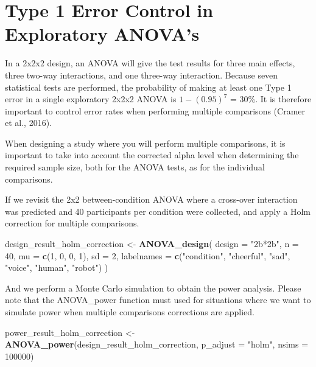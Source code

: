 \documentclass[
  ,man,floatsintext]{apa6}
\newenvironment{Shaded}{\begin{snugshade}}{\end{snugshade}}
\newcommand{\DataTypeTok}[1]{\textcolor[rgb]{0.13,0.29,0.53}{#1}}
\newcommand{\DecValTok}[1]{\textcolor[rgb]{0.00,0.00,0.81}{#1}}
\newcommand{\KeywordTok}[1]{\textcolor[rgb]{0.13,0.29,0.53}{\textbf{#1}}}
\newcommand{\NormalTok}[1]{#1}
\newcommand{\StringTok}[1]{\textcolor[rgb]{0.31,0.60,0.02}{#1}}
\begin{document}
\hypertarget{type-1-error-control-in-exploratory-anovas}{%
\section{Type 1 Error Control in Exploratory ANOVA's}\label{type-1-error-control-in-exploratory-anovas}}

In a 2x2x2 design, an ANOVA will give the test results for three main effects, three two-way interactions, and one three-way interaction.
Because seven statistical tests are performed, the probability of making at least one Type 1 error in a single exploratory 2x2x2 ANOVA is \(1-(0.95)^7\) = 30\%.
It is therefore important to control error rates when performing multiple comparisons (Cramer et al., 2016).

When designing a study where you will perform multiple comparisons, it is important to take into account the corrected alpha level when determining the required sample size, both for the ANOVA tests, as for the individual comparisons.

If we revisit the 2x2 between-condition ANOVA where a cross-over interaction was predicted and 40 participants per condition were collected, and apply a Holm correction for multiple comparisons.

\begin{Shaded}
\begin{Highlighting}[]
\NormalTok{design_result_holm_correction <-}
\StringTok{  }\KeywordTok{ANOVA_design}\NormalTok{(}
    \DataTypeTok{design =} \StringTok{"2b*2b"}\NormalTok{,}
    \DataTypeTok{n =} \DecValTok{40}\NormalTok{,}
    \DataTypeTok{mu =} \KeywordTok{c}\NormalTok{(}\DecValTok{1}\NormalTok{, }\DecValTok{0}\NormalTok{, }\DecValTok{0}\NormalTok{, }\DecValTok{1}\NormalTok{),}
    \DataTypeTok{sd =} \DecValTok{2}\NormalTok{,}
    \DataTypeTok{labelnames =} \KeywordTok{c}\NormalTok{(}\StringTok{"condition"}\NormalTok{, }\StringTok{"cheerful"}\NormalTok{, }\StringTok{"sad"}\NormalTok{, }
                   \StringTok{"voice"}\NormalTok{, }\StringTok{"human"}\NormalTok{, }\StringTok{"robot"}\NormalTok{)}
\NormalTok{  )}
\end{Highlighting}
\end{Shaded}

And we perform a Monte Carlo simulation to obtain the power analysis. Please note that the ANOVA\_power function must used for situations where we want to simulate power when multiple comparisons corrections are applied.

\begin{Shaded}
\begin{Highlighting}[]
\NormalTok{power_result_holm_correction <-}\StringTok{ }\KeywordTok{ANOVA_power}\NormalTok{(design_result_holm_correction,}
                                            \DataTypeTok{p_adjust =} \StringTok{"holm"}\NormalTok{,}
                                            \DataTypeTok{nsims =} \DecValTok{100000}\NormalTok{)}
\end{Highlighting}
\end{Shaded}
\end{document}
